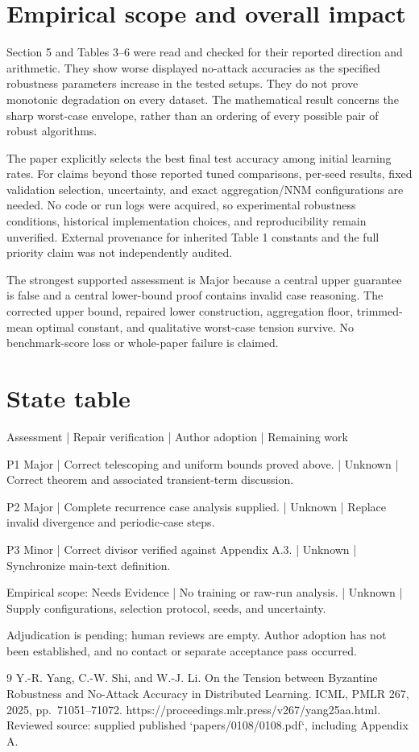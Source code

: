 \documentclass[10pt]{article}
\begin{document}
\section*{Empirical scope and overall impact}
Section 5 and Tables 3–6 were read and checked for their reported direction and arithmetic. They show worse displayed no-attack accuracies as the specified robustness parameters increase in the tested setups. They do not prove monotonic degradation on every dataset. The mathematical result concerns the sharp worst-case envelope, rather than an ordering of every possible pair of robust algorithms.\par
The paper explicitly selects the best final test accuracy among initial learning rates. For claims beyond those reported tuned comparisons, per-seed results, fixed validation selection, uncertainty, and exact aggregation/NNM configurations are needed. No code or run logs were acquired, so experimental robustness conditions, historical implementation choices, and reproducibility remain unverified. External provenance for inherited Table 1 constants and the full priority claim was not independently audited.\par
The strongest supported assessment is Major because a central upper guarantee is false and a central lower-bound proof contains invalid case reasoning. The corrected upper bound, repaired lower construction, aggregation floor, trimmed-mean optimal constant, and qualitative worst-case tension survive. No benchmark-score loss or whole-paper failure is claimed.\par
\section*{State table}
Assessment | Repair verification | Author adoption | Remaining work\par
P1 Major | Correct telescoping and uniform bounds proved above. | Unknown | Correct theorem and associated transient-term discussion.\par
P2 Major | Complete recurrence case analysis supplied. | Unknown | Replace invalid divergence and periodic-case steps.\par
P3 Minor | Correct divisor verified against Appendix A.3. | Unknown | Synchronize main-text definition.\par
Empirical scope: Needs Evidence | No training or raw-run analysis. | Unknown | Supply configurations, selection protocol, seeds, and uncertainty.\par
Adjudication is pending; human reviews are empty. Author adoption has not been established, and no contact or separate acceptance pass occurred.\par
9 Y.-R. Yang, C.-W. Shi, and W.-J. Li. On the Tension between Byzantine Robustness and No-Attack Accuracy in Distributed Learning. ICML, PMLR 267, 2025, pp. 71051–71072. https://proceedings.mlr.press/v267/yang25aa.html. Reviewed source: supplied published `papers/0108/0108.pdf`, including Appendix A.\par
\end{document}
